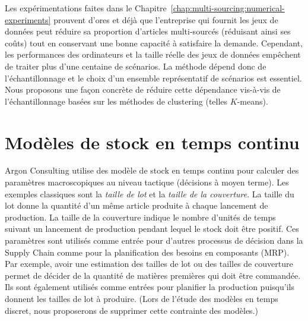 \medskip


Les expérimentations faites dans le Chapitre~\ref{chap:multi-sourcing:numerical-experiments} prouvent d'ores et déjà que l'entreprise qui fournit les jeux de données peut réduire sa proportion d'articles multi-sourcés (réduisant ainsi ses coûts) tout en conservant une bonne capacité à satisfaire la demande.
Cependant, les performances des ordinateurs et la taille réelle des jeux de données empêchent de traiter plus d'une centaine de scénarios.
La méthode dépend donc de l'échantillonnage et le choix d'un ensemble représentatif de scénarios est essentiel.
Nous proposons une façon concrète de réduire cette dépendance vis-à-vis de l'échantillonnage basées sur les méthodes de clustering (telles $K$-means).


\section{Modèles de stock en temps continu}
\label{sec:intro:fr:continuous-time-inventory-models}


Argon Consulting utilise des modèle de stock en temps continu pour calculer des paramètres macroscopiques au niveau tactique (décisions à moyen terme).
Les exemples classiques sont la \emph{taille de lot} et la \emph{taille de la couverture}.
La taille du lot donne la quantité d'un même article produite à chaque lancement de production.
La taille de la couverture indique le nombre d'unités de temps suivant un lancement de production pendant lequel le stock doit être positif.
Ces paramètres sont utilisés comme entrée pour d'autres processus de décision dans la Supply Chain comme pour la planification des besoins en composants (MRP).
Par exemple, avoir une estimation des tailles de lot ou des tailles de couverture permet de décider de la quantité de matières premières qui doit être commandée.
Ils sont également utilisés comme entrées pour planifier la production puisqu'ils donnent les tailles de lot à produire.
(Lors de l'étude des modèles en temps discret, nous proposerons de supprimer cette contrainte des modèles.)


